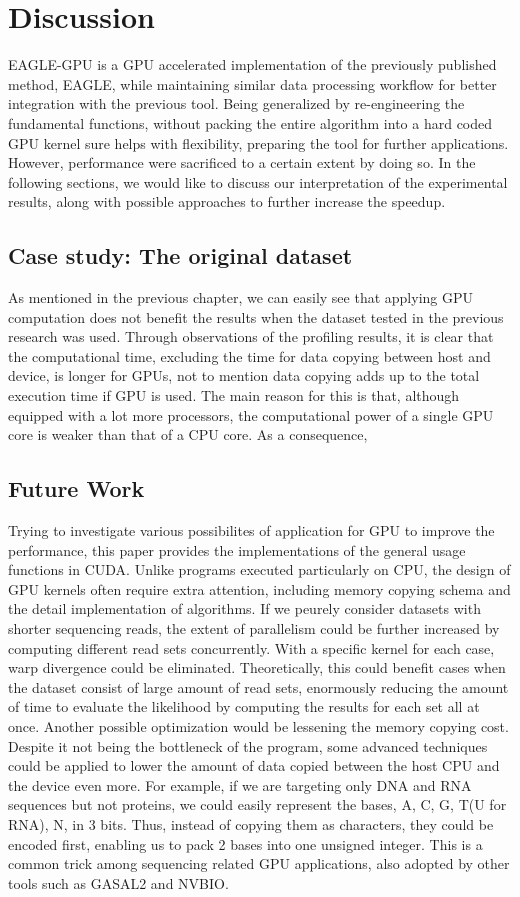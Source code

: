 \documentclass{PHlab-thesis}
\begin{document}
\chapter{Discussion}
EAGLE-GPU is a GPU accelerated implementation of the previously published method, EAGLE, while maintaining similar data processing workflow for better integration with the previous tool. Being generalized by re-engineering the fundamental functions, without packing the entire algorithm into a hard coded GPU kernel sure helps with flexibility, preparing the tool for further applications. However, performance were sacrificed to a certain extent by doing so. In the following sections, we would like to discuss our interpretation of the experimental results, along with possible approaches to further increase the speedup.

\section{Case study: The original dataset}
As mentioned in the previous chapter, we can easily see that applying GPU computation does not benefit the results when the dataset tested in the previous research was used. Through observations of the profiling results, it is clear that the computational time, excluding the time for data copying between host and device, is longer for GPUs, not to mention data copying adds up to the total execution time if GPU is used. The main reason for this is that, although equipped with a lot more processors, the computational power of a single GPU core is weaker than that of a CPU core. As a consequence, 

\section{Future Work}
Trying to investigate various possibilites of application for GPU to improve the performance, this paper provides the implementations of the general usage functions in CUDA. Unlike programs executed particularly on CPU, the design of GPU kernels often require extra attention, including memory copying schema and the detail implementation of algorithms. If we peurely consider datasets with shorter sequencing reads, the extent of parallelism could be further increased by computing different read sets concurrently. With a specific kernel for each case, warp divergence could be eliminated. Theoretically, this could benefit cases when the dataset consist of large amount of read sets, enormously reducing the amount of time to evaluate the likelihood by computing the results for each set all at once. Another possible optimization would be lessening the memory copying cost. Despite it not being the bottleneck of the program, some advanced techniques could be applied to lower the amount of data copied between the host CPU and the device even more. For example, if we are targeting only DNA and RNA sequences but not proteins, we could easily represent the bases, A, C, G, T(U for RNA), N, in 3 bits. Thus, instead of copying them as characters, they could be encoded first, enabling us to pack 2 bases into one unsigned integer. This is a common trick among sequencing related GPU applications, also adopted by other tools such as GASAL2 and NVBIO.
\end{document}
